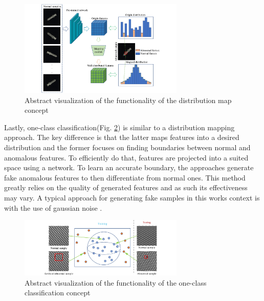 \begin{figure}[H]
    \centering
    \includegraphics[width=0.7\textwidth]{figures/approachvizgeneral/distmapviz.jpg}
    \caption{Abstract visualization of the functionality of the distribution map concept \cite{liu2024deep}}
    \label{fig:distmapviz}
\end{figure}

Lastly, one-class classification(Fig. \ref{fig:OCCviz}) is 
similar to a distribution mapping approach. The key difference is that the latter maps features into a desired distribution and the former focuses on finding boundaries between normal 
and anomalous features. To efficiently do that, features are projected into a suited space using a network. To learn an accurate boundary, the approaches generate fake anomalous features to 
then differentiate from normal ones. This method greatly relies on the quality of generated features and as such its effectiveness may vary. A typical approach for generating fake samples 
in this works context is with the use of gaussian noise \cite{liu2023simplenet}.

\begin{figure}[H]
    \centering
    \includegraphics[width=0.7\textwidth]{figures/approachvizgeneral/OCCviz.jpg}
    \caption{Abstract visualization of the functionality of the one-class classification concept \cite{liu2024deep}}
    \label{fig:OCCviz}
\end{figure}


